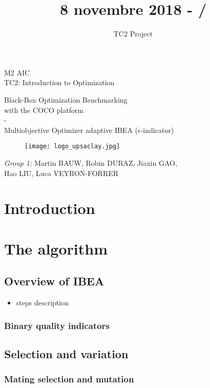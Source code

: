 \documentclass{beamer}
\title{8 novembre 2018 - \insertframenumber/\inserttotalframenumber}
\author{TC2 Project}
\begin{document}
\begin{frame}
\begin{center}
{ M2 AIC\\\footnotesize TC2: Introduction to Optimization}
\vfill
{\large
\begin{framed}
Black-Box Optimization Benchmarking\\ with the COCO platform\\ - \\Multiobjective Optimizer adaptive IBEA ($\epsilon$-indicator) 
\end{framed}
}
\vfill
\begin{figure}
\centering
\texttt{[image: logo\_upsaclay.jpg]}
\end{figure}

{\footnotesize \vfill \textit{Group 1:} Martin BAUW, Robin DURAZ, Jiaxin GAO,\\ Hao LIU, Luca VEYRON-FORRER}
\end{center}
\end{frame}

\begin{frame}
\tableofcontents
\end{frame}

\section{Introduction}
\begin{frame}

\end{frame}


\section{The algorithm}
\subsection{Overview of IBEA}
\begin{frame}
\begin{itemize}
\item steps description
\end{itemize}
\end{frame}


\begin{frame}
\frametitle{Binary quality indicators}

\end{frame}

\subsection{Selection and variation}
\begin{frame}
\frametitle{Mating selection and mutation}

\end{frame}
\end{document}
